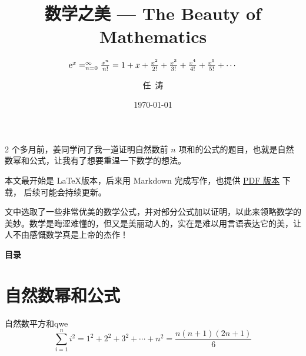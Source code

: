 \documentclass[12pt, cn]{elegantart}
\title{数学之美 --- The Beauty of Mathematics}
\subtitle{$\mathrm{e}^x=\relax_{n=0}^{\infty}\frac{x^n}{n!}=1+x+\frac{x^2}{2!}+\frac{x^3}{3!}+\frac{x^4}{4!}+\frac{x^5}{5!}+\cdots$}
\author{任\ 涛}
\date{\today}
\begin{document}
\maketitle

\begin{introduction}
\item 2 个多月前，姜同学问了我一道证明自然数前 $n$ 项和的公式的题目，也就是自然数幂和公式，让我有了想要重温一下数学的想法。
\item 本文最开始是 \LaTeX 版本，后来用 Markdown 完成写作，也提供 \href{https://tomben.me/the-beauty-of-mathematics/the-beauty-of-mathematics.pdf}{PDF 版本} 下载， 后续可能会持续更新。
\item 文中选取了一些非常优美的数学公式，并对部分公式加以证明，以此来领略数学的美妙。数学是晦涩难懂的，但又是美丽动人的，实在是难以用言语表达它的美，让人不由感慨数学真是上帝的杰作！
\end{introduction}

\vspace{1cm}
\begin{center}
	\Large\bfseries\color{structurecolor} 目\hspace{0.5em}录 \\[5pt]
\end{center}
\vspace{-0.8cm}
\tableofcontents
\clearpage

\section{自然数幂和公式}

\begin{theorem}{自然数平方和}{qwe}
\begin{equation}
   \sum_{i=1}^{n} i^{2}=1^2+2^2+3^2+\cdots+n^2=\frac{n(n+1)(2 n+1)}{6}
\end{equation}  
\end{theorem}
\end{document}
